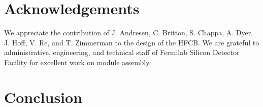 \section{Acknowledgements}

We appreciate the contribution of J.  Andresen, C. Britton, S. Chappa, A. Dyer, J. Hoff, V. Re, and T. Zimmerman to the design of the HFCB. We are grateful to administrative, engineering, and technical staff of Fermilab Silicon Detector Facility for excellent work on module assembly.

\section{Conclusion}




